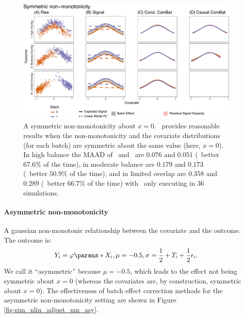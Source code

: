 {{{{\begin{figure}[h]
    \centering
    \includegraphics[width=\linewidth]{Figures/Supplement/Simulations/sim_nlin_adjust_nm_sym.pdf}
    \caption{A symmetric non-monotonicity about $x=0$. \ccombat~provides reasonable results when the non-monotonicity and the covariate distributions (for each batch) are symmetric about the same value (here, $x=0$). In high balance the MAAD of \ccombat~and \cccombat~are $0.076$ and $0.051$ (\cccombat~better $67.6\%$ of the time), in moderate balance are $0.179$ and $0.173$ (\cccombat~better $50.9\%$ of the time), and in limited overlap are $0.358$ and $0.289$ (\cccombat~better $66.7\%$ of the time) with \cccombat~only executing in $36$ simulations.}
    \label{fig:sim_nlin_adjust_nm_sym}
\end{figure}

\paragraph*{Asymmetric non-monotonicity} A gaussian non-monotonic relationship between the covariate and the outcome. The outcome is:
\begin{align*}
    Y_i = \varphi\parens*{X_i, \mu=-0.5, \sigma=\frac{1}{2}} + T_i + \frac{1}{2}\epsilon_i.
\end{align*}
We call it ``asymmetric'' because $\mu = -0.5$, which leads to the effect not being symmetric about $x = 0$ (whereas the covariates are, by construction, symmetric about $x=0$). The effectiveness of batch effect correction methods for the asymmetric non-monotonicity setting are shown in Figure \ref{fig:sim_nlin_adjust_nm_asy}.

}}}}
